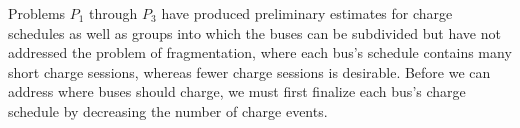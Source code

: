 \par Problems $P_1$ through $P_3$ have produced preliminary estimates for charge schedules as well as groups into which the buses can be subdivided but have not addressed the problem of fragmentation, where each bus's schedule contains many short charge sessions, whereas fewer charge sessions is desirable. Before we can address where buses should charge, we must first finalize each bus's charge schedule by decreasing the number of charge events.

